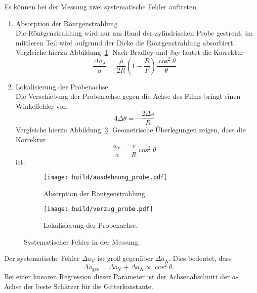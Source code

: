 Es können bei der Messung zwei systematische Fehler auftreten.
\begin{enumerate}
  \item\label{item:absorption} Absorption der Röntgenstrahlung \\
    Die Röntgenstrahlung wird nur am Rand der zylindrischen Probe gestreut,
    im mittleren Teil wird aufgrund der Dicke die Röntgenstrahlung absorbiert.
    Vergleiche hierzu Abbildung~\ref{fig:fehler_absorption}.
    Nach Bradley und Jay\cite{bradleyjay} lautet die Korrektur
    \begin{equation}
      \label{eq:korrektur_lokalisation}
      \frac{\Delta a_\text{A}}{a} = \frac{\rho}{2R}\left(1 - \frac{R}{F}\right) \frac{\cos^2\!\theta}{\theta}
    \end{equation}
  \item\label{item:lokalisierung} Lokalisierung der Probenachse \\
    Die Verschiebung der Probenachse gegen die Achse des Films bringt
    einen Winkelfehler von
    \begin{equation}
      4 \Delta \theta = -\frac{2 \Delta s}{R}
    \end{equation}
    Vergleiche hierzu Abbildung~\ref{fig:fehler_lokalisation}.
    Geometrische Überlegungen zeigen, dass die Korrektur
    \begin{equation}
      \frac{a_\text{V}}{a} = \frac{v}{R} \cos^2\!{\theta}
    \end{equation}
    ist.
\end{enumerate}

\begin{figure}
  \centering
  \begin{subfigure}[b]{0.48\textwidth}
    \centering
    \texttt{[image: build/ausdehnung\_probe.pdf]}
    \caption{%
      Absorption der Röntgenstrahlung.
    }%
    \label{fig:fehler_absorption}
  \end{subfigure}
  \begin{subfigure}[b]{0.48\textwidth}
    \centering
    \texttt{[image: build/verzug\_probe.pdf]}
    \caption{%
      Lokalisierung der Probenachse.
    }%
    \label{fig:fehler_lokalisation}
  \end{subfigure}
  \caption{%
    Systematischer Fehler in der Messung.\cite{anleitung}
  }
\end{figure}

Der systematische Fehler $\Delta a_\text{V}$ ist groß gegenüber $\Delta a_\text{A}$.
Dies bedeutet, dass
\begin{equation}
  \Delta a_\text{ges} = \Delta a_\text{V} + \Delta a_\text{A} \propto \cos^2\!{\theta}.
\end{equation}
Bei einer linearen Regression dieser Parameter ist
der Achsenabschnitt der $a$-Achse der beste Schätzer für die Gitterkonstante.

